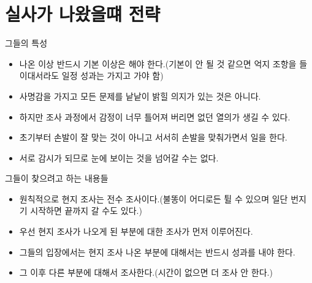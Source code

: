 \section{실사가 나왔을떄 전략}
\Large{그들의 특성}\normalsize
\par
\medskip
{}
\begin{itemize}\tightlist
\item 나온 이상 반드시 기본 이상은 해야 한다.(기본이 안 될 것 같으면 억지 조항을 들이대서라도 일정 성과는 가지고 가야 함)
\item 사명감을 가지고 모든 문제를 낱낱이 밝힐 의지가 있는 것은 아니다.
\item 하지만 조사 과정에서 감정이 너무 틀어져 버리면 없던 열의가 생길 수 있다.
\end{itemize}

\begin{itemize}\tightlist
\item 초기부터 손발이 잘 맞는 것이 아니고 서서히 손발을 맞춰가면서 일을 한다.
\item 서로 감시가 되므로 눈에 보이는 것을 넘어갈 수는 없다. 
\end{itemize}

\Large{그들이 찾으려고 하는 내용들}\normalsize
\par
\medskip
{}
\begin{itemize}\tightlist
\item 원칙적으로 현지 조사는 전수 조사이다.(불똥이 어디로든 튈 수 있으며 일단 번지기 시작하면 끝까지 갈 수도 있다.)
\item 우선 현지 조사가 나오게 된 부분에 대한 조사가 먼저 이루어진다.
\item 그들의 입장에서는 현지 조사 나온 부분에 대해서는 반드시 성과를 내야 한다.
\item 그 이후 다른 부분에 대해서 조사한다.(시간이 없으면 더 조사 안 한다.)
\end{itemize}


